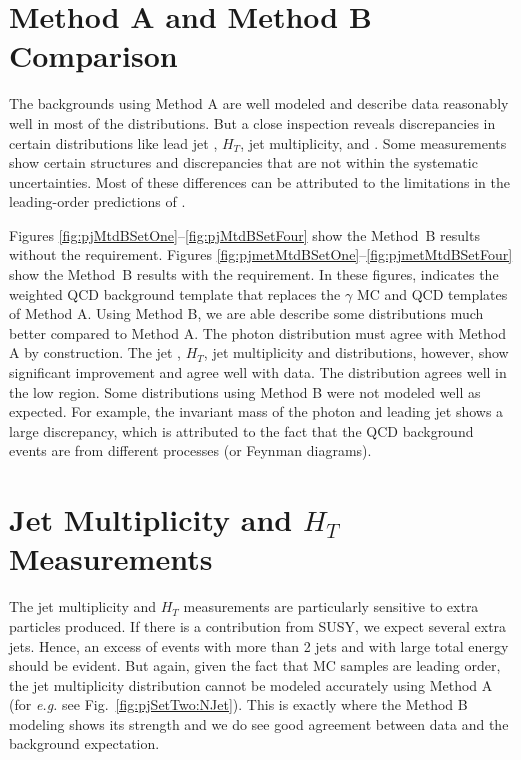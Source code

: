 \section{Method A and Method B Comparison}
The backgrounds using Method A are well modeled and describe data reasonably well in most of the distributions. But a close inspection reveals discrepancies in certain distributions like lead jet \et, $H_{T}$, jet multiplicity, and \met. Some measurements show certain structures and discrepancies that are not within the systematic uncertainties. Most of these differences can be attributed to the limitations in the leading-order predictions of \pythiaText.

Figures \ref{fig:pjMtdBSetOne}--\ref{fig:pjMtdBSetFour} show the Method~B results without the \met requirement. Figures \ref{fig:pjmetMtdBSetOne}--\ref{fig:pjmetMtdBSetFour} show the Method~B results with the \met requirement. In these figures,  indicates the weighted QCD background template that replaces the $\gamma$ MC and QCD templates of Method A. Using Method B, we are able describe some distributions much better compared to Method A. The photon \et distribution must agree with Method A by construction. The jet \et, $H_{T}$, jet multiplicity and \met distributions, however, show significant improvement and agree well with data. The \met distribution agrees well in the low \met region. Some distributions using Method B were not modeled well as expected. For example, the invariant mass of the photon and leading jet shows a large discrepancy, which is attributed to the fact that the QCD background events are from different processes (or Feynman diagrams).

\section{Jet Multiplicity and $H_{T}$ Measurements}
The jet multiplicity and $H_{T}$ measurements are particularly sensitive to extra particles produced. If there is a contribution from SUSY, we expect several extra jets. Hence, an excess of events with more than 2 jets and with large total energy should be evident. But again, given the fact that \pythiaText MC samples are leading order, the jet multiplicity distribution cannot be modeled accurately using Method A (for \textit{e.g.} see Fig.~\ref{fig:pjSetTwo:NJet}). This is exactly where the Method B modeling shows its strength and we do see good agreement between data and the background expectation.

